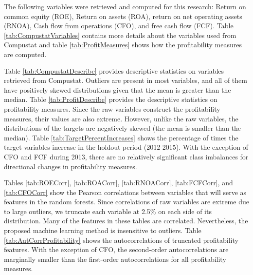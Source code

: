 The following variables were retrieved and computed for this research: Return on common equity (ROE),  Return on assets (ROA), return on net operating assets (RNOA), Cash flow from operations (CFO),  and free cash flow (FCF).  Table \ref{tab:CompustatVariables} contains more details about the variables used from Compustat and table \ref{tab:ProfitMeasures} shows how the profitability measures are computed.   


Table \ref{tab:CompustatDescribe} provides descriptive statistics on variables retrieved from Compustat. Outliers are present in most variables, and all of them have positively skewed distributions given that the mean is greater than the median. Table \ref{tab:ProfitDescribe} provides the descriptive statistics on profitability measures.  Since the raw variables construct the profitability measures, their values are also extreme.  However, unlike the raw variables, the distributions of the targets are negatively skewed (the mean is smaller than the median).  Table \ref{tab:TargetPercentIncreases} shows the percentage of times the target variables increase in the holdout period (2012-2015).   With the exception of CFO and FCF during 2013,  there are no relatively significant class imbalances for directional changes in profitability measures. 

Tables \ref{tab:ROECorr},  \ref{tab:ROACorr},  \ref{tab:RNOACorr},  \ref{tab:FCFCorr}, and \ref{tab:CFOCorr} show the Pearson correlations between variables that will serve as features in the random forests.  Since correlations of raw variables are extreme due to large outliers, we truncate each variable at 2.5\% on each side of its distribution.  Many of the features in these tables are correlated. Nevertheless, the proposed machine learning method is insensitive to outliers.   Table \ref{tab:AutCorrProfitability} shows the autocorrelations of truncated profitability features.  With the exception of CFO, the second-order autocorrelations are marginally smaller than the first-order autocorrelations for all profitability measures. 

